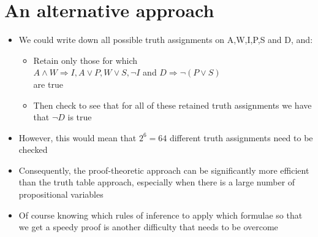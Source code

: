 \documentclass{article}[18pt]
\begin{document}
\section{An alternative approach}
\begin{itemize}
\item We could write down all possible truth assignments on A,W,I,P,S and D, and:
\begin{itemize}
\item Retain only those for which\\
$A\land W\Rightarrow I,A\lor P,W\lor S, \lnot I$ and $D\Rightarrow \lnot (P\lor S)$\\
are true
\item Then check to see that for all of these retained truth assignments we have that $\lnot D$ is true
\end{itemize}
\item However, this would mean that $2^6=64$ different truth assignments need to be checked
\item Consequently, the proof-theoretic approach can be significantly more efficient than the truth table approach, especially when there is a large number of propositional variables
\item Of course knowing which rules of inference to apply which formulae so that we get a speedy proof is another difficulty that needs to be overcome
\end{itemize}
\end{document}
